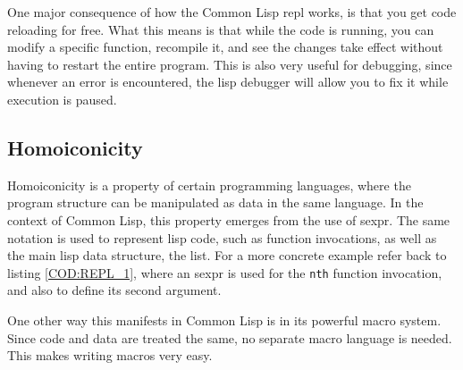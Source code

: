 One major consequence of how the Common Lisp \ac{repl} works,
is that you get code reloading for free.
What this means is that while the code is running,
you can modify a specific function,
recompile it,
and see the changes take effect without having to restart the entire program.
This is also very useful for debugging,
since whenever an error is encountered,
the lisp debugger will allow you to fix it while execution is paused.

\subsection{Homoiconicity}

Homoiconicity is a property of certain programming languages,
where the program structure can be manipulated as data in the same language.
In the context of Common Lisp,
this property emerges from the use of \acs{sexpr}.
The same notation is used to represent lisp code,
such as function invocations,
as well as the main lisp data structure,
the list.
For a more concrete example refer back to listing \ref{COD:REPL_1},
where an \ac{sexpr} is used for the \texttt{nth} function invocation,
and also to define its second argument.

One other way this manifests in Common Lisp is in its powerful macro system.
Since code and data are treated the same,
no separate macro language is needed.
This makes writing macros very easy.



